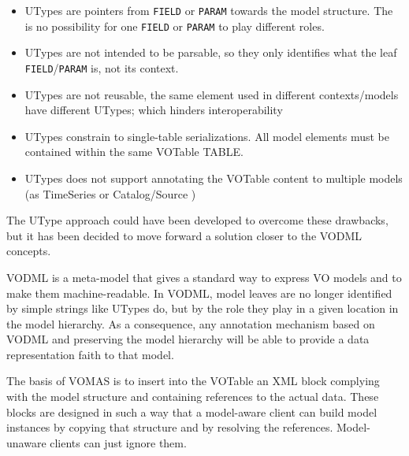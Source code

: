 \begin{itemize}
  \item UTypes are pointers from \texttt{FIELD} or \texttt{PARAM} towards the 
  model structure. The is no possibility for one  \texttt{FIELD} or
  \texttt{PARAM} to play different roles.
  \item UTypes are not intended to be parsable, so they only identifies what the leaf 
  \texttt{FIELD}/\texttt{PARAM} is, not its context.
  \item UTypes are not reusable, the same element used in different contexts/models 
  have different UTypes; which hinders interoperability
  \item UTypes constrain to single-table serializations. All model elements must 
  be contained within the same VOTable TABLE.
  \item UTypes does not support annotating the VOTable content to multiple models 
  (as TimeSeries or Catalog/Source )
\end{itemize}

The UType approach could have been developed to overcome these drawbacks, but it has been decided to move forward a solution closer to the VODML \citep{2018ivoa.spec.0910L} concepts. 

VODML is a meta-model that gives a standard way to express VO models and to make them machine-readable.
In VODML, model leaves are no longer identified by simple strings like UTypes do, but by the role they play in a given location in the model hierarchy.
As a consequence, any annotation mechanism based on VODML and preserving the model hierarchy will be able  to provide a data representation faith to that model.

The basis of VOMAS is to insert into the VOTable an XML block complying with the 
model structure and containing references to the actual data.
These blocks are designed in such a way that a model-aware client can build  model instances by copying that structure and by resolving the references. Model-unaware clients can just ignore them. 





